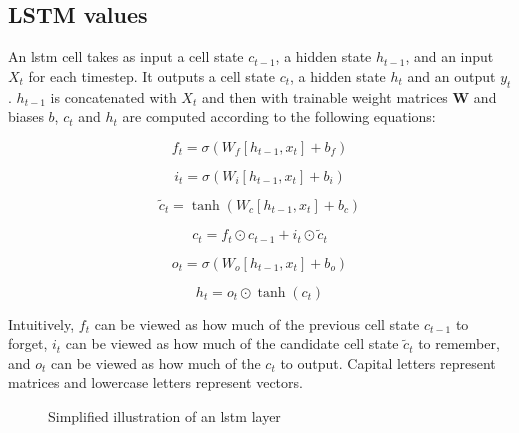 \documentclass[UKenglish]{uiomasterthesis}
\begin{document}
\subsection{LSTM values}
An \ac{lstm} cell takes as input a cell state $c_{t-1}$, a hidden state $h_{t-1}$, and an input $X_t$ for each timestep. It outputs a cell state $c_{t}$, a hidden state $h_{t}$ and an output $y_t$. $h_{t-1}$ is concatenated with $X_t$ and then with trainable weight matrices $\textbf{W}$ and biases $b$, $c_t$ and $h_t$ are computed according to the following equations:

\[
f_t = \sigma(W_f [h_{t-1}, x_t] + b_f)
\]

\[
i_t = \sigma(W_i [h_{t-1}, x_t] + b_i)
\]

\[
\tilde{c}_t = \tanh(W_c [h_{t-1}, x_t] + b_c)
\]

\[
c_t = f_t \odot c_{t-1} + i_t \odot \tilde{c}_t
\]

\[
o_t = \sigma(W_o [h_{t-1}, x_t] + b_o)
\]

\[
h_t = o_t \odot \tanh(c_t)
\]

Intuitively, $f_t$ can be viewed as how much of the previous cell state $c_{t-1}$ to forget, $i_t$ can be viewed as how much of the candidate cell state $\tilde{c}_t$ to remember, and $o_t$ can be viewed as how much of the $c_{t}$ to output. Capital letters represent matrices and lowercase letters represent vectors.

\begin{center}
\begin{figure}
\caption{Simplified illustration of an \ac{lstm} layer}
\label{fig:lstm}
\end{figure}
\end{center}
\end{document}
